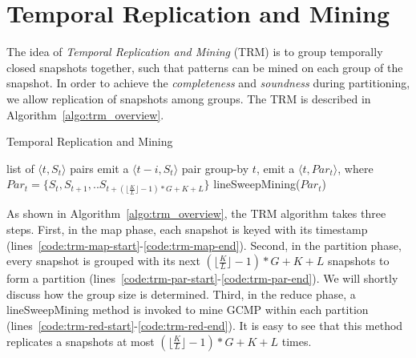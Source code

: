 \section{Temporal Replication and Mining}
\label{sec:trm_solution}
The idea of \emph{Temporal Replication and Mining} (TRM)
is to group temporally closed snapshots together, such that patterns can be
mined on each group of the snapshot. In order to achieve the \emph{completeness}
and \emph{soundness} during partitioning, we allow replication of
snapshots among groups. The TRM is described in Algorithm~\ref{algo:trm_overview}.


\begin{algorithm}
\caption{Temporal Replication and Mining}
\label{algo:trm_overview}
\begin{algorithmic}[1]
\Require list of $\langle t, S_t \rangle$ pairs
\label{code:trm-map-start}
		\State emit a $\langle t-i, S_t \rangle$ pair
	\EndFor 
\EndFor
\label{code:trm-map-end}
\label{code:trm-par-start}
\State group-by $t$, emit a $\langle t, Par_t\rangle$,
\State  where $Par_t = \{S_t, S_{t+1}, .. S_{t+(\lfloor \frac{K}{L} \rfloor -1)*G+K+L}\} $
\EndFor
\label{code:trm-par-end}
\label{code:trm-red-start}
\State lineSweepMining($Par_t$)
\label{code:trm-red-end}
\EndFor
\end{algorithmic}
\end{algorithm}

As shown in Algorithm~\ref{algo:trm_overview}, the TRM algorithm takes
three steps. First, in the map phase, each snapshot is keyed with its timestamp (lines~\ref{code:trm-map-start}-\ref{code:trm-map-end}). Second, in the partition phase, every snapshot is grouped with its next $(\lfloor \frac{K}{L} \rfloor -1)*G+K+L$ snapshots to form a partition (lines~\ref{code:trm-par-start}-\ref{code:trm-par-end}). We will shortly discuss how the group size is determined. Third, in the reduce phase, a lineSweepMining method is invoked to mine GCMP within each partition (lines~\ref{code:trm-red-start}-\ref{code:trm-red-end}). 
It is easy to see that this method replicates a snapshots at most $(\lfloor \frac{K}{L} \rfloor -1)*G+K+L$ times.

